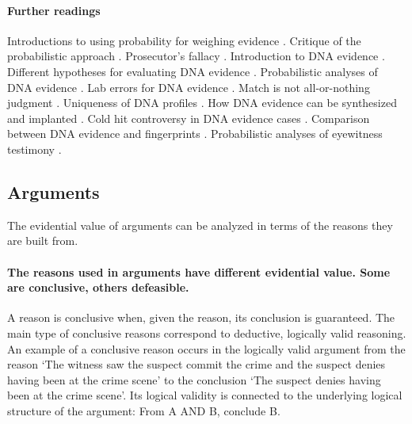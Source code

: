 \documentclass[10pt]{article}
\begin{document}
\paragraph{Further readings} Introductions to using probability for weighing evidence 
 \citep{finkelsteinFairley1970, dawid2002, morteraDawid2007}. Critique 
of the probabilistic approach \citep{tribe1971, cohen1977, allenPardo2007}.
Prosecutor's fallacy \citep{thompsonSchuman1987}.
Introduction to DNA evidence \citep{wasserman2008, kayeSensabaugh2000}.
Different hypotheses for evaluating DNA evidence \citep{koehler1993, cookEtAl1998, evettEtal2000}. 
Probabilistic analyses of DNA evidence  \citep{robertsonVignaux1995, buckleton2005, balding2005}. 
 Lab errors for DNA evidence \citep{thompsonEtAl2003}. 
 Match is not all-or-nothing judgment \citep{kaye1993}. 
Uniqueness of DNA profiles  \citep{kaye2013, weir2007}.
How DNA evidence can be synthesized and implanted \citep{frumkinEtAl2009}. 
Cold hit controversy in DNA evidence cases \citep{NRC1996, baldingDonnely1996}. 
Comparison between DNA evidence and fingerprints  \citep{zabell2005}. 
Probabilistic analyses of eyewitness testimony \citep{friedman1987, schum1994, schumStarace2001}. 

\subsection{Arguments}
\label{sec:valueArgs}

The evidential value of arguments can be analyzed in terms of the reasons they are built from.

\paragraph{The reasons used in arguments have different evidential value. Some are conclusive, others defeasible.} A reason is conclusive when, given  the reason, its conclusion is guaranteed. The main type of conclusive reasons correspond to deductive, logically valid reasoning. 
An example of a conclusive reason occurs in the logically valid argument from the reason `The witness saw the suspect commit the crime and the suspect denies having been at the crime scene' to the conclusion `The suspect denies having been at the crime scene'. Its logical validity is connected to the underlying logical structure of the argument: From A AND B, conclude B. 

\end{document}
